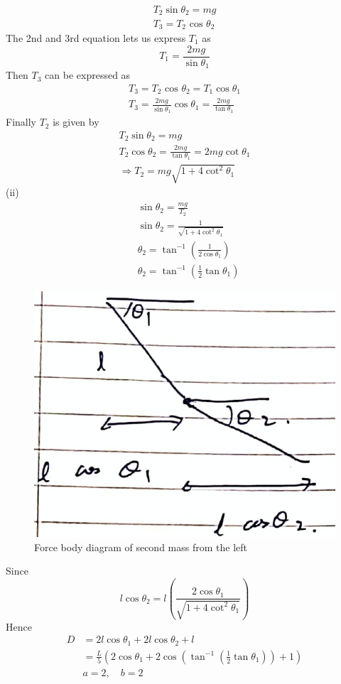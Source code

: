 \documentclass{article}
\begin{document}
\begin{align}
	T_{2} \sin \theta_{2}=m g \\
	T_{3}=T_{2} \text { cos } \theta_{2}
\end{align}
The 2nd and 3rd equation lets us express $T_1$ as 
\begin{equation}
	T_{1}=\frac{2 m{g}}{\sin \theta_{1}}
\end{equation}
Then $T_3$ can be expressed as
\begin{align}
	T_{3}=T_{2} \text { cos } \theta_{2}  = T_{1} \cos \theta_{1} \\
	T_3 = \frac{2 m{g}}{\sin \theta_{1}} \cos \theta_{1}=\frac{2 m g}{\tan \theta_1}
\end{align}
Finally $T_2$ is given by
\begin{equation}
	\begin{array}{l}
		T_{2} \sin \theta_{2}=m g \\
		T_{2} \cos \theta_{2}=\frac{2 m g}{\tan \theta_{1}}=2 m g \cot \theta_{1} \\
		\Rightarrow T_{2}=m g \sqrt{1+4 \cot ^{2} \theta_{1}}
	\end{array}
\end{equation}
(ii)
\begin{equation}
	\begin{aligned}
		&\sin \theta_{2}=\frac{m g}{T_{2}} \\
		&\operatorname{sin}\theta_{2}=\frac{1}{\sqrt{1+4 \cot ^{2} \theta_{1}}} \\
		&\theta_{2}=\tan ^{-1}\left(\frac{1}{2 \cos \theta_{1}}\right) \\
		&\theta_{2}=\tan ^{-1}\left(\frac{1}{2} \tan \theta_{1}\right)
	\end{aligned}
\end{equation}
\begin{figure}
	\centering
	\includegraphics[width=0.5\linewidth]{spho_book_TYS_images/2010q3_3.png}
	\caption{Force body diagram of second mass from the left}
\end{figure}
Since 
\begin{equation}
	l\cos \theta_{2} =l\left(\frac{2\cos\theta_{1}}{\sqrt{1+4\operatorname{cot}^{2} \theta_{1}}}\right)
\end{equation}
Hence
\begin{equation}
	\begin{aligned}
		D &=2 l \cos \theta_{1}+2 l \cos \theta_{2}+l \\
		&=\frac{L}{5}\left(2 \cos \theta_{1}+2 \cos \left(\tan ^{-1}\left(\frac{1}{2} \tan \theta_{1}\right)\right)+1\right) \\
		& a=2, \quad b=2
	\end{aligned}
\end{equation}
\end{document}
